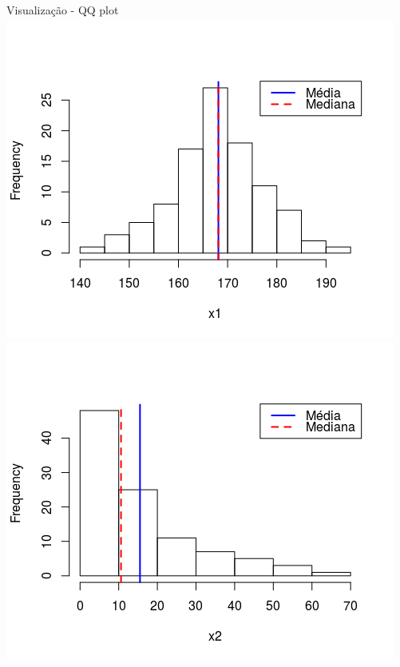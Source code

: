 \documentclass{beamer}
\begin{document}
\begin{frame}{Visualização - QQ plot}
  \centering
  \includegraphics[height=.5\textheight]{Cap37-38/normal2-h}
  \includegraphics[height=.5\textheight]{Cap37-38/lognormal2-h}


\end{frame}
\end{document}
